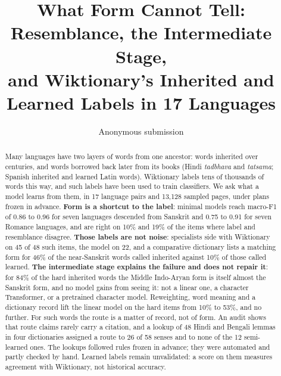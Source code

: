 \documentclass[11pt]{article}
\title{What Form Cannot Tell: Resemblance, the Intermediate Stage,\\and Wiktionary's Inherited and Learned Labels in 17 Languages}
\author{Anonymous submission}
\begin{document}
\maketitle

\begin{abstract}
Many languages have two layers of words from one ancestor: words inherited over centuries, and words borrowed back later from its books (Hindi \textit{tadbhava} and \textit{tatsama}; Spanish inherited and learned Latin words). Wiktionary labels tens of thousands of words this way, and such labels have been used to train classifiers. We ask what a model learns from them, in 17 language pairs and 13,128 sampled pages, under plans frozen in advance. \textbf{Form is a shortcut to the label}: minimal models reach macro-F1 of 0.86 to 0.96 for seven languages descended from Sanskrit and 0.75 to 0.91 for seven Romance languages, and are right on 10\% and 19\% of the items where label and resemblance disagree. \textbf{Those labels are not noise}: specialists side with Wiktionary on 45 of 48 such items, the model on 22, and a comparative dictionary lists a matching form for 46\% of the near-Sanskrit words called inherited against 10\% of those called learned. \textbf{The intermediate stage explains the failure and does not repair it}: for 84\% of the hard inherited words the Middle Indo-Aryan form is itself almost the Sanskrit form, and no model gains from seeing it: not a linear one, a character Transformer, or a pretrained character model. Reweighting, word meaning and a dictionary record lift the linear model on the hard items from 10\% to 53\%, and no further. For such words the route is a matter of record, not of form. An audit shows that route claims rarely carry a citation, and a lookup of 48 Hindi and Bengali lemmas in four dictionaries assigned a route to 26 of 58 senses and to none of the 12 semi-learned ones. The lookups followed rules frozen in advance; they were automated and partly checked by hand. Learned labels remain unvalidated: a score on them measures agreement with Wiktionary, not historical accuracy.
\end{abstract}
\end{document}

